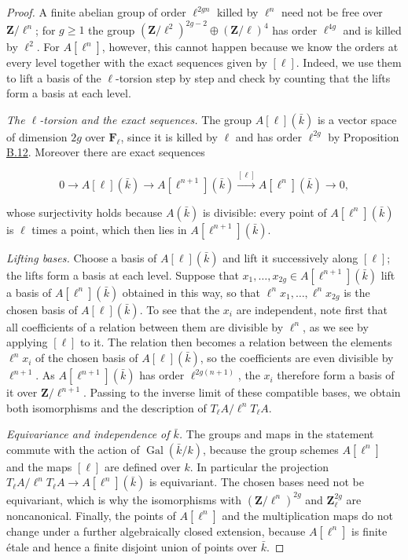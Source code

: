 \documentclass[11pt]{article}
\providecommand{\Fell}{}\renewcommand{\Fell}{\mathbf F_\ell}
\begin{document}
\begin{proof}[{Proof}]\label{bp115}%
A finite abelian group of order \(\ell^{2gn}\) killed by \(\ell^n\) need not be free over \(\mathbf Z/\ell^n\); for \(g\geq1\) the group \((\mathbf Z/\ell^2)^{2g-2}\oplus(\mathbf Z/\ell)^{4}\) has order \(\ell^{4g}\) and is killed by \(\ell^2\). For \(A[\ell^n]\), however, this cannot happen because we know the orders at every level together with the exact sequences given by \([\ell]\). Indeed, we use them to lift a basis of the \(\ell\)-torsion step by step and check by counting that the lifts form a basis at each level.

\emph{The \(\ell\)-torsion and the exact sequences.} The group \(A[\ell](\bar k)\) is a vector space of dimension \(2g\) over \(\Fell\), since it is killed by \(\ell\) and has order \(\ell^{2g}\) by Proposition \hyperref[bp108]{B.12}. Moreover there are exact sequences

\[
0\longrightarrow A[\ell](\bar k)
\longrightarrow A[\ell^{n+1}](\bar k)
\xrightarrow{[\ell]}A[\ell^n](\bar k)\longrightarrow0,
\]

whose surjectivity holds because \(A(\bar k)\) is divisible: every point of \(A[\ell^n](\bar k)\) is \(\ell\) times a point, which then lies in \(A[\ell^{n+1}](\bar k)\).

\emph{Lifting bases.} Choose a basis of \(A[\ell](\bar k)\) and lift it successively along \([\ell]\); the lifts form a basis at each level. Suppose that \(x_1,\ldots,x_{2g}\in A[\ell^{n+1}](\bar k)\) lift a basis of \(A[\ell^n](\bar k)\) obtained in this way, so that \(\ell^nx_1,\ldots,\ell^nx_{2g}\) is the chosen basis of \(A[\ell](\bar k)\). To see that the \(x_i\) are independent, note first that all coefficients of a relation between them are divisible by \(\ell^n\), as we see by applying \([\ell]\) to it. The relation then becomes a relation between the elements \(\ell^nx_i\) of the chosen basis of \(A[\ell](\bar k)\), so the coefficients are even divisible by \(\ell^{n+1}\). As \(A[\ell^{n+1}](\bar k)\) has order \(\ell^{2g(n+1)}\), the \(x_i\) therefore form a basis of it over \(\mathbf Z/\ell^{n+1}\). Passing to the inverse limit of these compatible bases, we obtain both isomorphisms and the description of \(T_\ell A/\ell^nT_\ell A\).

\emph{Equivariance and independence of \(\bar k\).} The groups and maps in the statement commute with the action of \(\operatorname{Gal}(\bar k/k)\), because the group schemes \(A[\ell^n]\) and the maps \([\ell]\) are defined over \(k\). In particular the projection \(T_\ell A/\ell^nT_\ell A\to A[\ell^n](\bar k)\) is equivariant. The chosen bases need not be equivariant, which is why the isomorphisms with \((\mathbf Z/\ell^n)^{2g}\) and \(\mathbf Z_\ell^{2g}\) are noncanonical. Finally, the points of \(A[\ell^n]\) and the multiplication maps do not change under a further algebraically closed extension, because \(A[\ell^n]\) is finite étale and hence a finite disjoint union of points over \(\bar k\).
\end{proof}
\end{document}
